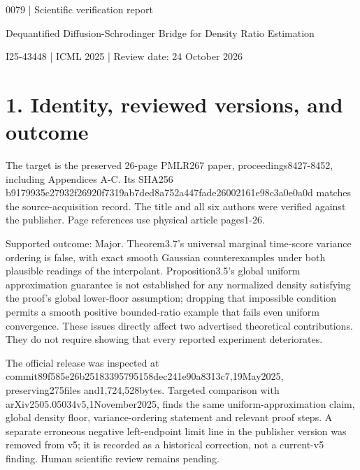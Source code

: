 \documentclass[10pt]{article}
\begin{document}
0079 | Scientific verification report\par
Dequantified Diffusion-Schrodinger Bridge for Density Ratio Estimation\par
I25-43448 | ICML 2025 | Review date: 24 October 2026\par
\section*{1. Identity, reviewed versions, and outcome}
The target is the preserved 26-page PMLR267 paper, proceedings8427-8452, including Appendices A-C. Its SHA256 b9179935c27932f26920f7319ab7ded8a752a447fade26002161e98c3a0e0a0d matches the source-acquisition record. The title and all six authors were verified against the publisher. Page references use physical article pages1-26.\par
Supported outcome: Major. Theorem3.7’s universal marginal time-score variance ordering is false, with exact smooth Gaussian counterexamples under both plausible readings of the interpolant. Proposition3.5’s global uniform approximation guarantee is not established for any normalized density satisfying the proof’s global lower-floor assumption; dropping that impossible condition permits a smooth positive bounded-ratio example that fails even uniform convergence. These issues directly affect two advertised theoretical contributions. They do not require showing that every reported experiment deteriorates.\par
The official release was inspected at commit89f585e26b25183395795158dec241e90a8313c7,19May2025, preserving275files and1,724,528bytes. Targeted comparison with arXiv2505.05034v5,1November2025, finds the same uniform-approximation claim, global density floor, variance-ordering statement and relevant proof steps. A separate erroneous negative left-endpoint limit line in the publisher version was removed from v5; it is recorded as a historical correction, not a current-v5 finding. Human scientific review remains pending.\par
\end{document}
